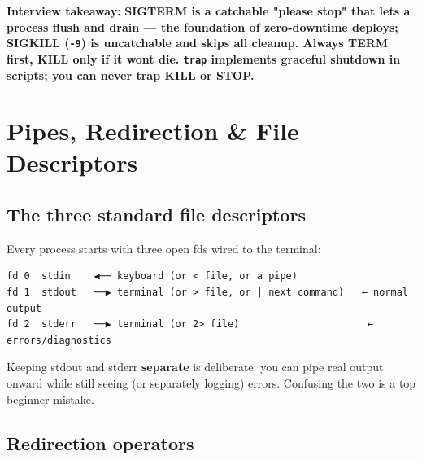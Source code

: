 \documentclass[11pt]{article}
\begin{document}
\textbf{Interview takeaway:} \textbf{SIGTERM is a catchable "please stop" that lets a process flush and drain --- the foundation of zero-downtime deploys; SIGKILL (\texttt{-9}) is uncatchable and skips all cleanup. Always TERM first, KILL only if it won\textquotesingle t die. \texttt{trap} implements graceful shutdown in scripts; you can never trap KILL or STOP.}

\section{Pipes, Redirection \& File Descriptors}\label{pipes-redirection--file-descriptors}

\subsection{The three standard file descriptors}\label{the-three-standard-file-descriptors}

Every process starts with three open fds wired to the terminal:

\setcodelang{}

\begin{verbatim}
fd 0  stdin    ◀── keyboard (or < file, or a pipe)
fd 1  stdout   ──▶ terminal (or > file, or | next command)   ← normal output
fd 2  stderr   ──▶ terminal (or 2> file)                      ← errors/diagnostics
\end{verbatim}

Keeping stdout and stderr \textbf{separate} is deliberate: you can pipe real output onward while still seeing (or separately logging) errors. Confusing the two is a top beginner mistake.

\subsection{Redirection operators}\label{redirection-operators}

\end{document}
